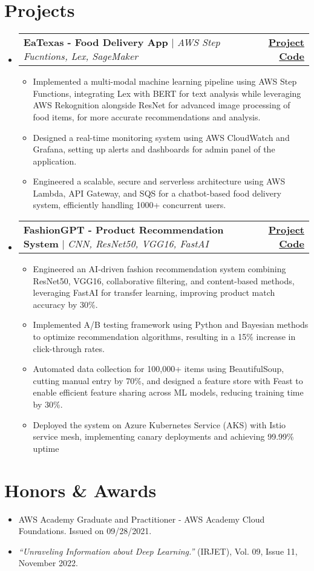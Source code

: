 \documentclass[letterpaper,10pt]{article} %
\makeatletter
\newcommand{\resumeItem}[1]{
  \item\small{
    {#1 \vspace{-2pt}}
  }
}
\newcommand{\resumeProjectHeading}[2]{
    \item
    \begin{tabular*}{1.001\textwidth}{l@{\extracolsep{\fill}}r}
      \small#1 & \textbf{\small #2} \\
    \end{tabular*}\vspace{-5pt}
}
\newcommand{\resumeSubHeadingListStart}{\begin{itemize}[leftmargin=0.0in, label={}]}
\newcommand{\resumeSubHeadingListEnd}{\end{itemize}}
\newcommand{\resumeItemListStart}{\justify \begin{itemize} \vspace{-3pt}} %
\newcommand{\resumeItemListEnd}{\end{itemize}\vspace{-3pt}}
\makeatother
\begin{document}
\section{Projects}
    \resumeSubHeadingListStart
        \resumeProjectHeading
            {\textbf{EaTexas - Food Delivery App} $|$ \emph{AWS Step Fucntions, Lex, SageMaker}}{\href{https://github.com/simarmehta/EaTexas}{Project Code}}
            \resumeItemListStart
                \resumeItem{Implemented a multi-modal machine learning pipeline using AWS Step Functions, integrating Lex with BERT for text analysis while leveraging AWS Rekognition alongside ResNet for advanced image processing of food items, for more accurate recommendations and analysis.}
                \resumeItem{Designed a real-time monitoring system using AWS CloudWatch and Grafana, setting up alerts and dashboards for admin panel of the application.}
                \resumeItem{Engineered a scalable, secure and serverless architecture using AWS Lambda, API Gateway, and SQS for a chatbot-based food delivery system, efficiently handling 1000+ concurrent users.}
            \resumeItemListEnd
            
        \resumeProjectHeading
            {\textbf{FashionGPT - Product Recommendation System} $|$ \emph{CNN, ResNet50, VGG16, FastAI}}{\href{https://github.com/simarmehta/FashionGPT-Resnet50/tree/master/Fashion-Rec-Sys-main}{Project Code}}
            \resumeItemListStart
                \resumeItem{Engineered an AI-driven fashion recommendation system combining ResNet50, VGG16, collaborative filtering, and content-based methods, leveraging FastAI for transfer learning, improving product match accuracy by 30\%.}
                \resumeItem{Implemented A/B testing framework using Python and Bayesian methods to optimize recommendation algorithms, resulting in a 15\% increase in click-through rates.}
                \resumeItem{Automated data collection for 100,000+ items using BeautifulSoup, cutting manual entry by 70\%, and designed a feature store with Feast to enable efficient feature sharing across ML models, reducing training time by 30\%.}
                \resumeItem{Deployed the system on Azure Kubernetes Service (AKS) with Istio service mesh, implementing canary deployments and achieving 99.99\% uptime}
            \resumeItemListEnd
    \resumeSubHeadingListEnd
    
\section{Honors \& Awards}
 \begin{itemize}[leftmargin=0.15in, label={}]
    \item{AWS Academy Graduate and Practitioner - AWS Academy Cloud Foundations. Issued on 09/28/2021.}
    \item{\textit{“Unraveling Information about Deep Learning.”} (IRJET), Vol. 09, Issue 11, November 2022.}
 \end{itemize}
\end{document}
